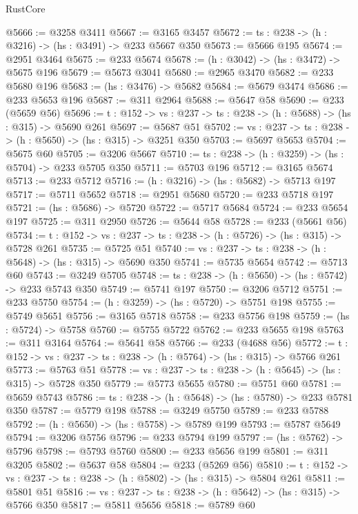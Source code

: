 \begin{lexlean}{RustCore}
\begin{coremodule}
@5666 := @3258 @3411
@5667 := @3165 @3457
@5672 := {ts : @238} -> (h : @3216) -> (hs : @3491) -> @233 @5667 @350
@5673 := @5666 @195
@5674 := @2951 @3464
@5675 := @233 @5674
@5678 := (h : @3042) -> (hs : @3472) -> @5675 @196
@5679 := @5673 @3041
@5680 := @2965 @3470
@5682 := @233 @5680 @196
@5683 := (hs : @3476) -> @5682
@5684 := @5679 @3474
@5686 := @233 @5653 @196
@5687 := @311 @2964
@5688 := @5647 @58
@5690 := @233 (@5659 @56)
@5696 := {t : @152} -> {vs : @237} -> {ts : @238} -> (h : @5688) -> (hs : @315) -> @5690 @261
@5697 := @5687 @51
@5702 := {vs : @237} -> {ts : @238} -> (h : @5650) -> (hs : @315) -> @3251 @350
@5703 := @5697 @5653
@5704 := @5675 @60
@5705 := @3206 @5667
@5710 := {ts : @238} -> (h : @3259) -> (hs : @5704) -> @233 @5705 @350
@5711 := @5703 @196
@5712 := @3165 @5674
@5713 := @233 @5712
@5716 := (h : @3216) -> (hs : @5682) -> @5713 @197
@5717 := @5711 @5652
@5718 := @2951 @5680
@5720 := @233 @5718 @197
@5721 := (hs : @5686) -> @5720
@5722 := @5717 @5684
@5724 := @233 @5654 @197
@5725 := @311 @2950
@5726 := @5644 @58
@5728 := @233 (@5661 @56)
@5734 := {t : @152} -> {vs : @237} -> {ts : @238} -> (h : @5726) -> (hs : @315) -> @5728 @261
@5735 := @5725 @51
@5740 := {vs : @237} -> {ts : @238} -> (h : @5648) -> (hs : @315) -> @5690 @350
@5741 := @5735 @5654
@5742 := @5713 @60
@5743 := @3249 @5705
@5748 := {ts : @238} -> (h : @5650) -> (hs : @5742) -> @233 @5743 @350
@5749 := @5741 @197
@5750 := @3206 @5712
@5751 := @233 @5750
@5754 := (h : @3259) -> (hs : @5720) -> @5751 @198
@5755 := @5749 @5651
@5756 := @3165 @5718
@5758 := @233 @5756 @198
@5759 := (hs : @5724) -> @5758
@5760 := @5755 @5722
@5762 := @233 @5655 @198
@5763 := @311 @3164
@5764 := @5641 @58
@5766 := @233 (@4688 @56)
@5772 := {t : @152} -> {vs : @237} -> {ts : @238} -> (h : @5764) -> (hs : @315) -> @5766 @261
@5773 := @5763 @51
@5778 := {vs : @237} -> {ts : @238} -> (h : @5645) -> (hs : @315) -> @5728 @350
@5779 := @5773 @5655
@5780 := @5751 @60
@5781 := @5659 @5743
@5786 := {ts : @238} -> (h : @5648) -> (hs : @5780) -> @233 @5781 @350
@5787 := @5779 @198
@5788 := @3249 @5750
@5789 := @233 @5788
@5792 := (h : @5650) -> (hs : @5758) -> @5789 @199
@5793 := @5787 @5649
@5794 := @3206 @5756
@5796 := @233 @5794 @199
@5797 := (hs : @5762) -> @5796
@5798 := @5793 @5760
@5800 := @233 @5656 @199
@5801 := @311 @3205
@5802 := @5637 @58
@5804 := @233 (@5269 @56)
@5810 := {t : @152} -> {vs : @237} -> {ts : @238} -> (h : @5802) -> (hs : @315) -> @5804 @261
@5811 := @5801 @51
@5816 := {vs : @237} -> {ts : @238} -> (h : @5642) -> (hs : @315) -> @5766 @350
@5817 := @5811 @5656
@5818 := @5789 @60

\end{coremodule}
\end{lexlean}
